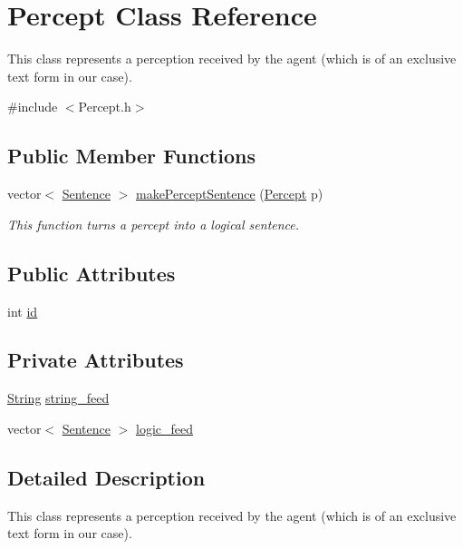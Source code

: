 \hypertarget{classPercept}{}\section{Percept Class Reference}
\label{classPercept}


This class represents a perception received by the agent (which is of an exclusive text form in our case).  




{\ttfamily \#include $<$Percept.\+h$>$}

\subsection*{Public Member Functions}
\begin{DoxyCompactItemize}
\item 
vector$<$ \mbox{\hyperlink{classSentence}{Sentence}} $>$ \mbox{\hyperlink{classPercept_a3912d5efafea356d07436b791a97684c}{make\+Percept\+Sentence}} (\mbox{\hyperlink{classPercept}{Percept}} p)
\begin{DoxyCompactList}\small\item\em This function turns a percept into a logical sentence. \end{DoxyCompactList}\end{DoxyCompactItemize}
\subsection*{Public Attributes}
\begin{DoxyCompactItemize}
\item 
int \mbox{\hyperlink{classPercept_a87baa8b4903f43f03a86430185a36840}{id}}
\end{DoxyCompactItemize}
\subsection*{Private Attributes}
\begin{DoxyCompactItemize}
\item 
\mbox{\hyperlink{classString}{String}} \mbox{\hyperlink{classPercept_acd9d577a5dce1064a78d87f26ec10be7}{string\+\_\+feed}}
\item 
vector$<$ \mbox{\hyperlink{classSentence}{Sentence}} $>$ \mbox{\hyperlink{classPercept_a4b92db8d220627cd58a61eb8f6d1faa6}{logic\+\_\+feed}}
\end{DoxyCompactItemize}


\subsection{Detailed Description}
This class represents a perception received by the agent (which is of an exclusive text form in our case). 

